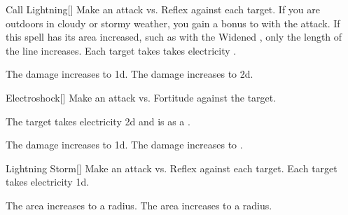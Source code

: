 \lowercase{\hypertarget{spell:Call Lightning}{}}\label{spell:Call Lightning}
\begin{freeability}[Rank 3]{\hypertarget{spell:Call Lightning}{Call Lightning}}[]
Make an attack vs. Reflex against each target.
If you are outdoors in cloudy or stormy weather, you gain a  bonus to  with the attack.
If this spell has its area increased, such as with the Widened , only the length of the line increases.
\hit Each target takes takes electricity .


\rankline
{} The damage increases to  \plus1d.
 The damage increases to  \plus2d.
\end{freeability}
\vspace{0.25em}



\lowercase{\hypertarget{spell:Electroshock}{}}\label{spell:Electroshock}
\begin{freeability}[Rank 3]{\hypertarget{spell:Electroshock}{Electroshock}}[]
Make an attack vs. Fortitude against the target.

\hit The target takes electricity  \minus2d and is  as a .

\rankline
{} The damage increases to  \minus1d.
 The damage increases to .
\end{freeability}
\vspace{0.25em}



\lowercase{\hypertarget{spell:Lightning Storm}{}}\label{spell:Lightning Storm}
\begin{freeability}[Rank 3]{\hypertarget{spell:Lightning Storm}{Lightning Storm}}[]
Make an attack vs. Reflex against each target.
\hit Each target takes electricity  \minus1d.

\rankline
{} The area increases to a \arealarge radius.
 The area increases to a \areahuge radius.
\end{freeability}
\vspace{0.25em}



